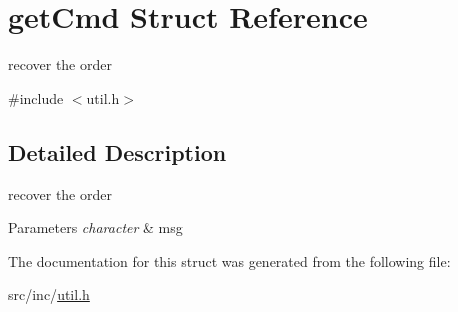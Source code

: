 \hypertarget{structget_cmd}{}\section{get\+Cmd Struct Reference}
\label{structget_cmd}


recover the order  




{\ttfamily \#include $<$util.\+h$>$}



\subsection{Detailed Description}
recover the order 


\begin{DoxyParams}{Parameters}
{\em character} & msg \\
\hline
\end{DoxyParams}


The documentation for this struct was generated from the following file\+:\begin{DoxyCompactItemize}
\item 
src/inc/\mbox{\hyperlink{util_8h}{util.\+h}}\end{DoxyCompactItemize}
